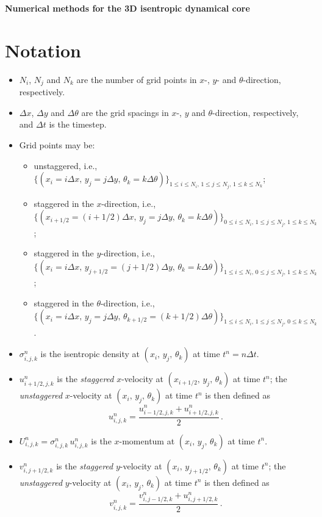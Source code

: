 \documentclass{article}
\numberwithin{equation}{section}
\begin{document}
	\noindent \textbf{\LARGE{Numerical methods for the 3D isentropic dynamical core}}
	\normalsize

	\section{Notation}
		\begin{itemize}
			\item $N_i$, $N_j$ and $N_{k}$ are the number of grid points in $x$-, $y$- and $\theta$-direction, respectively.
			\item $\Delta x$, $\Delta y$ and $\Delta \theta$ are the grid spacings in $x$-, $y$ and $\theta$-direction, respectively, and $\Delta t$ is the timestep.
			\item Grid points may be:
				\begin{itemize}
					\item unstaggered, i.e., $\lbrace (x_i = i \Delta x, \, y_j = j \Delta y, \, \theta_k = k \Delta \theta) \rbrace_{1 \leq i \leq N_i, \, 1 \leq j \leq N_j, \, 1 \leq k \leq N_k}$;
					\item staggered in the $x$-direction, i.e., $\lbrace (x_{i+1/2} = (i + 1/2) \Delta x, \, y_j = j \Delta y, \, \theta_k = k \Delta \theta) \rbrace_{0 \leq i \leq N_i, \, 1 \leq j \leq N_j, \, 1 \leq k \leq N_k}$;
					\item staggered in the $y$-direction, i.e., $\lbrace (x_i = i \Delta x, \, y_{j + 1/2} = (j + 1/2) \Delta y, \, \theta_k = k \Delta \theta) \rbrace_{1 \leq i \leq N_i, \, 0 \leq j \leq N_j, \, 1 \leq k \leq N_k}$;
					\item staggered in the $\theta$-direction, i.e., $\lbrace (x_i = i \Delta x, \, y_j = j \Delta y, \, \theta_{k+1/2} = (k + 1/2) \Delta \theta) \rbrace_{1 \leq i \leq N_i, \, 1 \leq j \leq N_j, \, 0 \leq k \leq N_k}$.
				\end{itemize}
			\item $\sigma_{i,j,k}^n$ is the isentropic density at $(x_i, \, y_j, \, \theta_k)$ at time $t^n = n \Delta t$.
			\item $u_{i+1/2,j,k}^n$ is the \emph{staggered} $x$-velocity at $(x_{i+1/2}, \, y_j, \, \theta_k)$ at time $t^n$; the \emph{unstaggered} $x$-velocity at $(x_i, \, y_j, \, \theta_k)$ at time $t^n$ is then defined as \[ u_{i,j,k}^n = \dfrac{u_{i-1/2,j,k}^n + u_{i+1/2,j,k}^n}{2} \, . \]
			\item $U_{i,j,k}^n = \sigma_{i,j,k}^n \, u_{i,j,k}^n$ is the $x$-momentum at $(x_i, \, y_j, \, \theta_k)$ at time $t^n$.
			\item $v_{i,j+1/2,k}^n$ is the \emph{staggered} $y$-velocity at $(x_i, \, y_{j+1/2}, \, \theta_k)$ at time $t^n$; the \emph{unstaggered} $y$-velocity at $(x_i, \, y_j, \, \theta_k)$ at time $t^n$ is then defined as \[ v_{i,j,k}^n = \dfrac{v_{i,j-1/2,k}^n + u_{i,j+1/2,k}^n}{2} \, . \]

\end{itemize}
\end{document}
